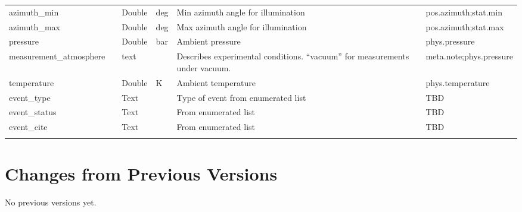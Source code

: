\documentclass[11pt,a4paper]{ivoa}
\begin{document}
\begin{longtable}{p{3.5cm}p{0.5cm}p{1cm}p{1cm}p{7cm}p{3cm}}
azimuth\_min&&Double&deg&Min azimuth angle for illumination&pos.azimuth;stat.min\\

azimuth\_max&&Double&deg&Max azimuth angle for illumination&pos.azimuth;stat.max\\

pressure&&Double&bar&Ambient pressure&phys.pressure\\

measurement\_atmosphere&&text&&Describes experimental conditions. ``vacuum'' for measurements under vacuum.&meta.note;phys.pressure\\

temperature&&Double&K&Ambient temperature&phys.temperature\\

event\_type&&Text&&Type of event from enumerated list&TBD\\

event\_status&&Text&&From enumerated list&TBD\\

event\_cite&&Text&&From enumerated list&TBD\\

\sptablerule

\end{longtable}

\endgroup



\appendix
\section{Changes from Previous Versions}

No previous versions yet.  



\end{document}
